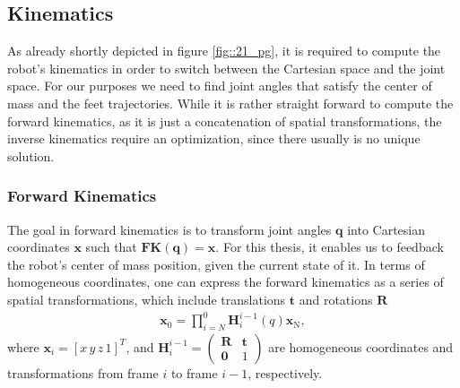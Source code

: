 \FloatBarrier
\subsection{Kinematics}
\label{sec::214_k}
As already shortly depicted in figure \ref{fig::21_pg}, it is required to compute the robot's kinematics in order to switch between the Cartesian space and the joint space. For our purposes we need to find joint angles that satisfy the center of mass and the feet trajectories. While it is rather straight forward to compute the forward kinematics, as it is just a concatenation of spatial transformations, the inverse kinematics require an optimization, since there usually is no unique solution.
\FloatBarrier
\subsubsection{Forward Kinematics}
\label{sec::2141_fk}
The goal in forward kinematics is to transform joint angles $\bm{q}$ into Cartesian coordinates $\bm{x}$ such that $\textbf{FK}(\bm{q}) = \bm{x}$. For this thesis, it enables us to feedback the robot's center of mass position, given the current state of it. In terms of homogeneous coordinates, one can express the forward kinematics as a series of spatial transformations, which include translations $\bm{t}$ and rotations $\bm{R}$ 
\begin{align}
	\bm{x}_\text{0} = \prod_{i=N}^{0}\bm{H}_i^{i-1}(q)\bm{x}_\text{N},
\end{align}
where $\bm{x}_i=[x\,y\,z\,1]^T$, and $\bm{H}_i^{i-1}=\begin{pmatrix}\bm{R} & \bm{t} \\ \bm{0} & 1 \end{pmatrix}$ are homogeneous coordinates and transformations from frame $i$ to frame $i-1$, respectively.
\FloatBarrier
